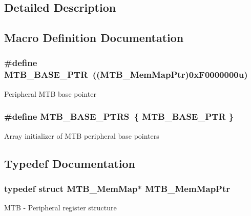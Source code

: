 \subsection{Detailed Description}


\subsection{Macro Definition Documentation}
\hypertarget{group___m_t_b___peripheral_gadf7f362dfa67354951e6a23ddf08cd73}{}
\subsubsection[{M\+T\+B\+\_\+\+B\+A\+S\+E\+\_\+\+P\+T\+R}]{\setlength{\rightskip}{0pt plus 5cm}\#define M\+T\+B\+\_\+\+B\+A\+S\+E\+\_\+\+P\+T\+R~(({\bf M\+T\+B\+\_\+\+Mem\+Map\+Ptr})0x\+F0000000u)}\label{group___m_t_b___peripheral_gadf7f362dfa67354951e6a23ddf08cd73}
Peripheral M\+T\+B base pointer \hypertarget{group___m_t_b___peripheral_ga45b3138a9794fd8f2c7613b48646e44f}{}
\subsubsection[{M\+T\+B\+\_\+\+B\+A\+S\+E\+\_\+\+P\+T\+R\+S}]{\setlength{\rightskip}{0pt plus 5cm}\#define M\+T\+B\+\_\+\+B\+A\+S\+E\+\_\+\+P\+T\+R\+S~\{ {\bf M\+T\+B\+\_\+\+B\+A\+S\+E\+\_\+\+P\+T\+R} \}}\label{group___m_t_b___peripheral_ga45b3138a9794fd8f2c7613b48646e44f}
Array initializer of M\+T\+B peripheral base pointers 

\subsection{Typedef Documentation}
\hypertarget{group___m_t_b___peripheral_ga2d3d13148d5c08e92b1ad2eeb14342da}{}
\subsubsection[{M\+T\+B\+\_\+\+Mem\+Map\+Ptr}]{\setlength{\rightskip}{0pt plus 5cm}typedef struct {\bf M\+T\+B\+\_\+\+Mem\+Map}$\ast$ {\bf M\+T\+B\+\_\+\+Mem\+Map\+Ptr}}\label{group___m_t_b___peripheral_ga2d3d13148d5c08e92b1ad2eeb14342da}
M\+T\+B -\/ Peripheral register structure 